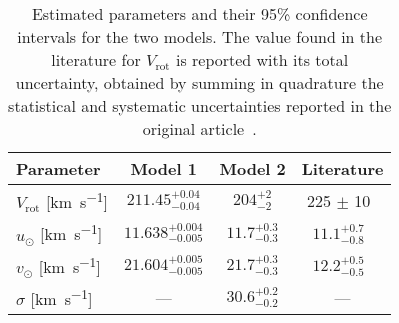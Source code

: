 \begin{table}[H]
    \centering

    \begin{tabular}{l c c | c}
        \hline
        Parameter & Model 1 & Model 2 & Literature\\
        \hline
        $V_{\text{rot}}$ [\unit{\kilo\meter\per\second}] & $211.45_{-0.04}^{+0.04}$ & $204_{-2}^{+2}$ & 225 $\pm$ 10~\cite{GalacticKinematics} \\
        $u_{\odot}$ [\unit{\kilo\meter\per\second}] & $11.638_{-0.005}^{+0.004}$ & $11.7_{-0.3}^{+0.3}$ & $11.1_{-0.8}^{+0.7}$~\cite{LocalKinematics} \\
        $v_{\odot}$ [\unit{\kilo\meter\per\second}] & $21.604_{-0.005}^{+0.005}$ & $21.7_{-0.3}^{+0.3}$ & $12.2^{+0.5}
        _{-0.5}$~\cite{LocalKinematics} \\
        $\sigma$ [\unit{\kilo\meter\per\second}] & --- & $30.6_{-0.2}^{+0.2}$ & --- \\
        \hline
    \end{tabular}
    \caption{Estimated parameters and their 95\% confidence intervals for the two models. The value found in the literature for $V_{\text{rot}}$ is reported with its total uncertainty, obtained by summing in quadrature the statistical and systematic uncertainties reported in the original article~\cite{GalacticKinematics}.}
    \label{tab:parameter_estimates}
\end{table}

